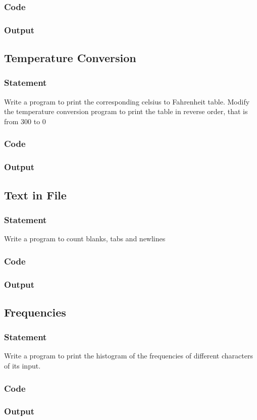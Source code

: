 \subsubsection{Code}
\subsubsection{Output}

\pagebreak
\subsection{Temperature Conversion}
\subsubsection{Statement}
Write a program to print the corresponding celsius to Fahrenheit table. Modify the
temperature conversion program to print the table in reverse order, that is from 300 to 0
\subsubsection{Code}
\subsubsection{Output}

\pagebreak
\subsection{Text in File}
\subsubsection{Statement}
Write a program to count blanks, tabs and newlines
\subsubsection{Code}
\subsubsection{Output}

\pagebreak
\subsection{Frequencies}
\subsubsection{Statement}
Write a program to print the histogram of the frequencies of different characters of its input.
\subsubsection{Code}
\subsubsection{Output}